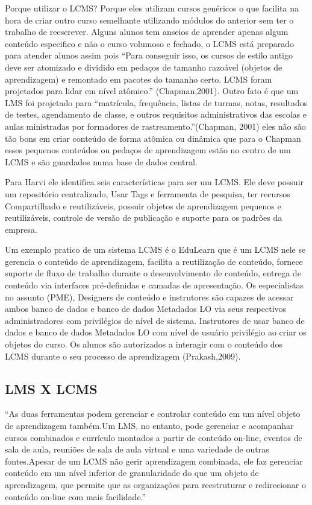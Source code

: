 \documentclass[12pt]{article}
\begin{document}
Porque utilizar o LCMS? Porque eles utilizam cursos genéricos o que facilita na hora de criar outro curso semelhante utilizando módulos do anterior sem ter o trabalho de reescrever. Alguns alunos tem anseios de aprender apenas algum conteúdo especifico e não o curso volumoso e fechado, o LCMS está preparado para atender alunos assim pois “Para conseguir isso, os cursos de estilo antigo deve ser atomizado e dividido em pedaços de tamanho razoável (objetos de aprendizagem) e remontado em pacotes do tamanho certo. LCMS foram projetados para lidar em nível atômico.” (Chapman,2001). Outro fato é que um LMS foi projetado para “matrícula, frequência, listas de turmas, notas, resultados de testes, agendamento de classe, e outros requisitos administrativos das escolas e aulas ministradas por formadores de rastreamento.”(Chapman, 2001) eles não são tão bons em criar conteúdo de forma atômica ou dinâmica que para o Chapman esses pequenos conteúdos ou pedaços de aprendizagem estão no centro de um LCMS e são guardados numa base de dados central.


Para Harvi ele identifica seis características para ser um LCMS. Ele deve possuir um repositório centralizado, Usar Tags e ferramenta de pesquisa, ter recursos Compartilhado e reutilizáveis, possuir objetos de aprendizagem pequenos e reutilizáveis, controle de versão de publicação e suporte para os padrões da empresa.


Um exemplo pratico de um sistema LCMS é o EduLearn que é um LCMS nele se gerencia o conteúdo de aprendizagem, facilita a reutilização de conteúdo, fornece suporte de fluxo de trabalho durante o desenvolvimento de conteúdo, entrega de conteúdo via interfaces pré-definidas e camadas de apresentação. Os especialistas no assunto (PME), Designers de conteúdo e instrutores são capazes de acessar ambos banco de dados e banco de dados Metadados LO via seus respectivos administradores com privilégios de nível de sistema. Instrutores de usar banco de dados e banco de dados Metadados LO com nível de usuário privilégio ao criar os objetos do curso. Os alunos são autorizados a interagir com o conteúdo dos LCMS durante o seu processo de aprendizagem (Prakash,2009).


\subsection{LMS X LCMS}

“As duas ferramentas podem gerenciar e controlar conteúdo em um nível objeto de aprendizagem também.Um LMS, no entanto, pode gerenciar e acompanhar cursos combinados e currículo montados a partir de conteúdo on-line, eventos de sala de aula, reuniões de sala de aula virtual e uma variedade de outras fontes.Apesar de um LCMS não gerir aprendizagem combinada, ele faz gerenciar conteúdo em um nível inferior de granularidade do que um objeto de aprendizagem, que permite que as organizações para reestruturar e redirecionar o conteúdo on-line com mais facilidade.”
\end{document}
